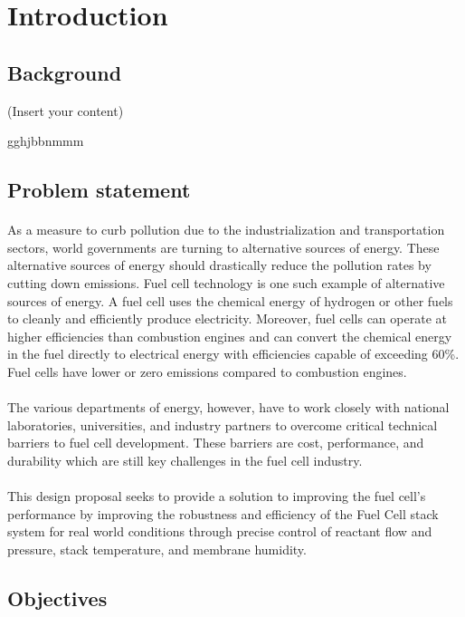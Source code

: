 \section{Introduction}
\label{sec:introduction}
\subsection{Background}
(Insert your content)

gghjbbnmmm

\subsection{Problem statement}
\paragraph{}As a measure to curb pollution due to the industrialization and transportation sectors, world governments are turning to alternative sources of energy. These alternative sources of energy should drastically reduce the pollution rates by cutting down emissions. Fuel cell technology is one such example of alternative sources of energy. A fuel cell uses the chemical energy of hydrogen or other fuels to cleanly and efficiently produce electricity. Moreover, fuel cells can operate at higher efficiencies than combustion engines and can convert the chemical energy in the fuel directly to electrical energy with efficiencies capable of exceeding 60\%. Fuel cells have lower or zero emissions compared to combustion engines.
\paragraph{}The various departments of energy, however,  have to work closely with national laboratories, universities, and industry partners to overcome critical technical barriers to fuel cell development. These barriers are cost, performance, and durability which are still key challenges in the fuel cell industry. 
\paragraph{}This design proposal seeks to provide a solution to improving the fuel cell’s performance by improving the robustness and efficiency of the Fuel Cell stack system for real world conditions through precise control of reactant flow and pressure, stack temperature, and membrane humidity.
\subsection{Objectives}

